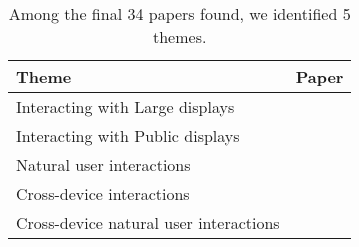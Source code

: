 \begin{table}[h!]
\centering
\begin{tabular}{@{}lp{3cm}@{}}
\toprule
Theme & Paper \\ \midrule
Interacting with Large displays      & \cite{Weiser:1991} \cite{Hinrichs:2013:IPD:2478559.2478965} \cite{Wellner:1993} \cite{Buxton:2000} \\%
Interacting with Public displays      & \cite{Brignull:2003} \cite{Ojala:2012:MIP:2225044.2225065} \cite{Schieck:2012:AEM:2393132.2393141} \cite{Boring:2013} \cite{Jacucci:2010} \cite{Ren:2013} \cite{Lucero:2012} \cite{Valkanova:2014} \cite{Huang:2003} \\%
Natural user interactions      & \cite{Keefe:2001} \cite{Vogel:2005} \cite{Aigner:2012} \cite{Karam:2005} \cite{Walter:2014} \cite{Wigdor:2011} \cite{Wilson:2010} \cite{KinectFiction:2010} \cite{KinnectPower:2012} \\%
Cross-device interactions      & \cite{Scharf:2013} \cite{Rikimoto:2014} \cite{Hamilton:2014} \cite{Radle:2015} \cite{Schmidt:2012} \cite{Boring:2009} \\%
Cross-device natural user interactions      & \cite{Marquardt:2011} \cite{Marquardt:2012} \cite{Seifert:2012} \cite{Bragton:2011} \\%
\bottomrule
\end{tabular}
\caption{Among the final 34 papers found, we identified 5 themes.}
\label{table:themes}
\end{table}






